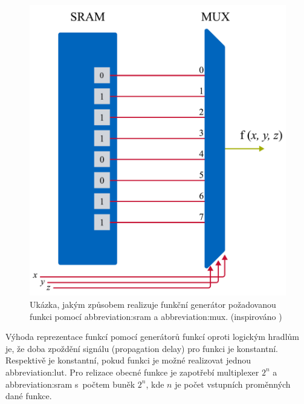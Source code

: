 \documentclass[a4paper, twoside, 11pt]{article}
\begin{document}
	\begin{minipage}[t]{0.45\textwidth}
		\begin{figure}[H]
			\centering
				\includegraphics[width=1\textwidth]{src/pdf/fpga-function-generator.pdf} 
				\caption{Ukázka, jakým způsobem realizuje funkční generátor požadovanou funkci pomocí \gls{abbreviation:sram} a \gls{abbreviation:mux}. (inspirováno \cite{Sass2010})}
				\label{fig:fpga-function-generator}
		\end{figure}
	\end{minipage}

	\vspace*{0.5cm}
	Výhoda reprezentace funkcí pomocí generátorů funkcí oproti logickým hradlům je, že doba zpoždění signálu (propagation delay) pro funkci je konstantní. Respektivě je konstantní, pokud funkci je možné realizovat jednou \gls{abbreviation:lut}. Pro relizace obecné funkce je zapotřebí multiplexer $2^{n}$  a \gls{abbreviation:sram} s~počtem buněk $2^{n}$, kde $n$ je počet vstupních proměnných dané funkce. \cite{Sass2010}
\end{document}
